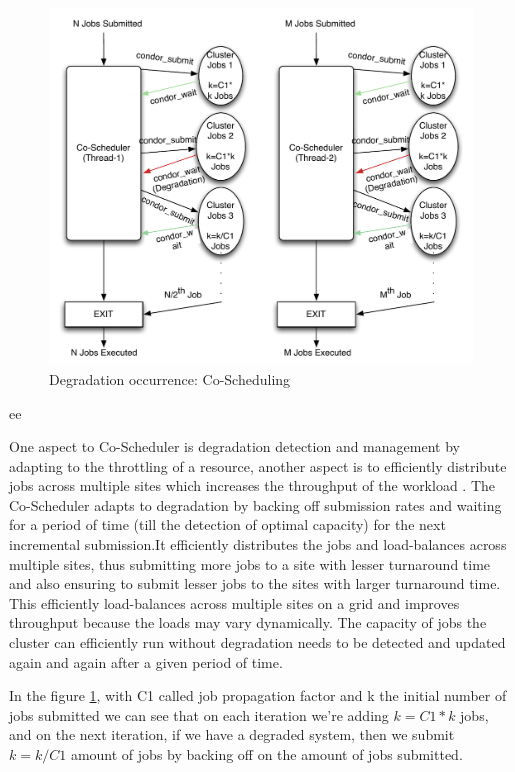 \documentclass[ms,electronic,double]{nuthesis}
\begin{document}
\begin{figure}[htbp!]
\begin{center}
\includegraphics[scale=0.75]{images/degradation_detection}
\caption{Degradation occurrence: Co-Scheduling}
\label{fig:degradationdetect-intro}
\end{center}
\end{figure}ee

One aspect to Co-Scheduler is degradation detection and management by adapting 
to the throttling of a resource, another aspect is to efficiently distribute jobs 
across multiple sites which increases the throughput of the workload
. The Co-Scheduler adapts to degradation by backing off submission rates and waiting for a 
period of time (till the detection of optimal capacity) for the next incremental submission.It efficiently 
distributes the jobs and load-balances across multiple sites, thus submitting more 
jobs to a site with lesser turnaround time and also ensuring to submit lesser 
jobs to the sites with larger turnaround time. This efficiently load-balances 
across multiple sites on a grid and improves throughput because the loads may vary dynamically. 
The capacity of jobs the cluster can efficiently run without degradation needs to be detected and updated again and 
again after a given period of time.

In the figure \ref{fig:degradationdetect-intro}, with C1 called job propagation factor and k the initial number of 
jobs submitted we can see that on each iteration we're adding $k = C1 * k$ jobs, and on the
next iteration, if we have a degraded system, then we submit $k=k/C1$ amount of 
jobs by backing off on the amount of jobs submitted.
\end{document}
